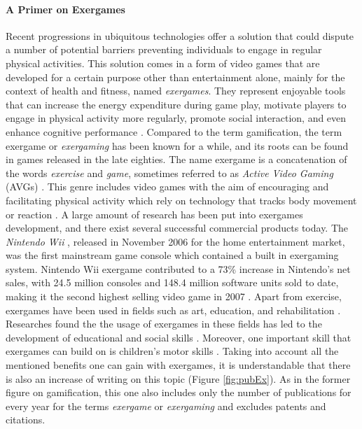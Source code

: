 \paragraph{A Primer on Exergames}
Recent progressions in ubiquitous technologies offer a solution that could dispute a number of potential barriers preventing individuals to engage in regular physical activities. This solution comes in a form of video games that are developed for a certain purpose other than entertainment alone, mainly for the context of health and fitness, named \textit{exergames}. They represent enjoyable tools that can increase the energy expenditure during game play, motivate players to engage in physical activity more regularly, promote social interaction, and even enhance cognitive performance \cite{staiano2011exergames}. Compared to the term gamification, the term exergame or \textit{exergaming} has been known for a while, and its roots can be found in games released in the late eighties. The name exergame is a concatenation of the words \textit{exercise} and \textit{game}, sometimes referred to as \textit{Active Video Gaming} (AVGs) \cite{altamimi2012survey}. This genre includes video games with the aim of encouraging and facilitating physical activity which rely on technology that tracks body movement or reaction \cite{altamimi2012survey}. A large amount of research has been put into exergames development, and there exist several successful commercial
products today. The \textit{Nintendo Wii} \cite{wii}, released in November 2006 for the home entertainment market, was the first mainstream game console which contained a built in exergaming system. Nintendo Wii exergame contributed to a 73\% increase in Nintendo's net sales, with 24.5 million consoles and 148.4 million software units sold to date, making it the second highest selling video game in 2007 \cite{staiano2011exergames}. Apart from exercise, exergames have been used in fields such as art, education, and rehabilitation  \cite{altamimi2012survey}. Researches found the the usage of exergames in these fields has led to the 
development of educational and social skills \cite{altamimi2012survey}. Moreover, one important skill that exergames can build on is children's motor skills \cite{delgado2009low}. Taking into account all the mentioned benefits one can gain with exergames, it is understandable that there is also an increase of writing on this topic (Figure \ref{fig:pubEx}). As in the former figure on gamification, this one also includes only the number of publications for every year for the terms \textit{exergame} or \textit{exergaming} and excludes patents and citations. 
